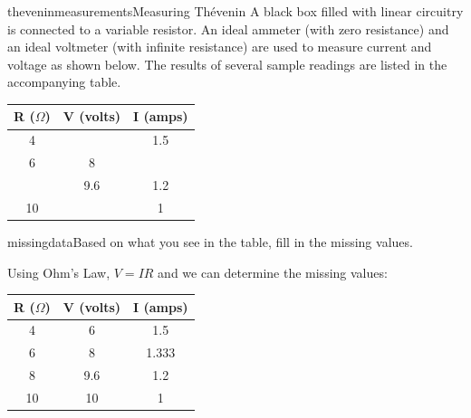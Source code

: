 \begin{mainquestion}{theveninmeasurements}{Measuring Thévenin}
A black box filled with linear circuitry is connected to a variable resistor.  An ideal ammeter (with zero resistance) and an ideal voltmeter (with infinite resistance) are used to measure current and voltage as shown below. The results of several sample readings are listed in the accompanying table.

\begin{table}[htbp]
\centering
\label{tab:measurements}
\begin{tabular}{|c | c |  c|}
\hline
\textbf{R ($\Omega$)} & \textbf{V (volts)} & \textbf{I (amps)} \\
\hline
4 &  & 1.5 \\ \hline
6 & 8 & \\ \hline
 & 9.6 & 1.2 \\ \hline
10 &  & 1 \\ \hline

\end{tabular}
\end{table}

\begin{partquestion}{missingdata}{Based on what you see in the table, fill in the missing values.}
\begin{answer}
Using Ohm's Law, $V=IR$ and we can determine the missing values:
\begin{table}[htbp]
\centering
\label{tab:measurementsfilled}
\begin{tabular}{|c | c |  c|}
\hline
\textbf{R ($\Omega$)} & \textbf{V (volts)} & \textbf{I (amps)} \\
\hline
4 & 6 & 1.5 \\ \hline
6 & 8 & 1.333\\ \hline
8 & 9.6 & 1.2 \\ \hline
10 & 10  & 1 \\ \hline
\end{tabular}
\end{table}
\end{answer}
\end{partquestion}


\end{mainquestion}
